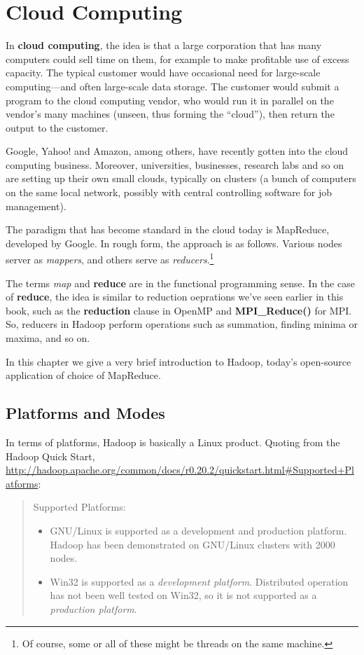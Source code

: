 \chapter{Cloud Computing}
\label{chap:cloud}


In {\bf cloud computing}, the idea is that a large corporation that has
many computers could sell time on them, for example to make profitable
use of excess capacity.   The typical customer would have occasional
need for large-scale computing---and often large-scale data storage.
The customer would submit a program to the cloud computing vendor, who
would run it in parallel on the vendor's many machines (unseen, thus
forming the ``cloud''), then return the output to the customer.  

Google, Yahoo! and Amazon, among others, have recently gotten into the
cloud computing business.  Moreover, universities, businesses, research
labs and so on are setting up their own small clouds, typically on
clusters (a bunch of computers on the same local network, possibly with
central controlling software for job management).  

The paradigm that has become standard in the cloud today is MapReduce,
developed by Google.  In rough form, the approach is as follows.
Various nodes server as {\it mappers}, and others serve as {\it
reducers}.\footnote{Of course, some or all of these might be threads on
the same machine.}

The terms {\it map} and {\bf reduce} are in the functional programming
sense.  In the case of {\bf reduce}, the idea is similar to reduction
oeprations we've seen earlier in this book, such as the {\bf reduction} 
clause in OpenMP and {\bf MPI\_Reduce()} for MPI.  So, reducers in
Hadoop perform operations such as summation, finding minima or maxima,
and so on.

In this chapter we give a very brief introduction to Hadoop, today's
open-source application of choice of MapReduce.  

\section{Platforms and Modes}

In terms of platforms, Hadoop is basically a Linux product.  Quoting
from the Hadoop Quick Start,
\url{http://hadoop.apache.org/common/docs/r0.20.2/quickstart.html#Supported+Platforms}:

\begin{quote}
Supported Platforms:

\begin{itemize}

\item GNU/Linux is supported as a development and production platform.
Hadoop has been demonstrated on GNU/Linux clusters with 2000 nodes. 

\item Win32 is supported as a {\it development platform}. Distributed
operation has not been well tested on Win32, so it is not supported as a
{\it production platform}. 

\end{itemize}

\end{quote}


